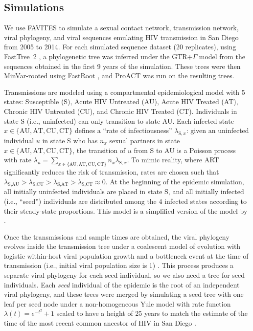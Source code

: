 \documentclass[a4paper,10pt]{article}
\begin{document}
\subsection{Simulations}
We use FAVITES to simulate a sexual contact network, transmission network, viral phylogeny, and viral sequences emulating HIV transmission in San Diego from 2005 to 2014. 
For each simulated sequence dataset (20 replicates),
using FastTree~2 \supercite{Price2010},
a phylogenetic tree was inferred under the GTR+$\Gamma$  model from the sequences obtained in the first 9 years of the simulation.
These trees were then MinVar-rooted using FastRoot \supercite{Mai2017},
and ProACT was run on the resulting trees.

Transmissions are modeled using a compartmental epidemiological model with 5 states: Susceptible (S), Acute HIV Untreated (AU), Acute HIV Treated (AT), Chronic HIV Untreated (CU), and Chronic HIV Treated (CT). Individuals in state S (i.e., uninfected) can only transition to state AU. Each infected state $x\in\{\text{AU},\text{AT},\text{CU},\text{CT}\}$ defines a ``rate of infectiousness'' $\lambda_{\text{S},x}$: given an uninfected individual $u$ in state S who has $n_x$ sexual partners in state $x\in\{\text{AU},\text{AT},\text{CU},\text{CT}\}$, the transition of $u$ from S to AU is a Poisson process with rate $\lambda_u=\sum_{x\in\{\text{AU},\text{AT},\text{CU},\text{CT}\}}{n_{x}\lambda_{\text{S},x}}$. To mimic reality, where ART significantly reduces the risk of transmission, rates are chosen such that $\lambda_{\text{S},\text{AU}} > \lambda_{\text{S},\text{CU}} > \lambda_{\text{S},\text{AT}} > \lambda_{\text{S},\text{CT}} \approx 0$. At the beginning of the epidemic simulation, all initially uninfected individuals are placed in state S, and all initially infected (i.e., ``seed'') individuals are distributed among the 4 infected states according to their steady-state proportions.
This model is a simplified version of the model  by \textcite{Granich2009}.

Once the transmissions and sample times are obtained, the viral phylogeny evolves inside the transmission tree under a coalescent model of evolution with logistic within-host viral population growth and a bottleneck event at the time of transmission (i.e., initial viral population size is 1) \supercite{Ratmann2017}.
This process produces a separate viral phylogeny for each seed individual, so we also need a tree for seed individuals. Each \textit{seed} individual of the epidemic is the root of an independent viral phylogeny, and these trees were merged by simulating a seed tree with one leaf per seed node under a non-homogeneous Yule model \supercite{LeGat2016} with rate function $\lambda(t)=e^{-t^2}+1$ scaled to have a height of 25 years to match the estimate of the time of the most recent common ancestor of HIV in San Diego \citep[see][for details]{Moshiri2018}. 
\end{document}
